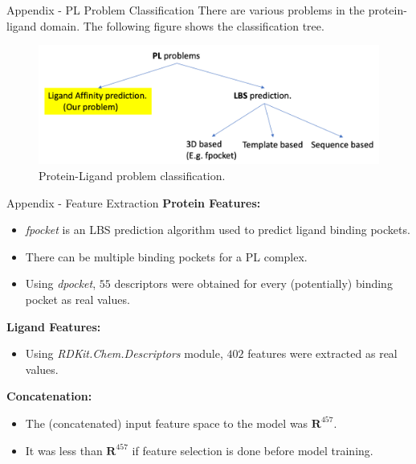 \documentclass{beamer}
\begin{document}
\begin{frame}[t]{Appendix - PL Problem Classification}
There are various problems in the protein-ligand domain.  The following figure shows the classification tree.

\begin{figure}[htb]
  \centering
    \includegraphics[scale=0.35]{images/pl_problem_classification}
    \caption{Protein-Ligand problem classification.}
    \label{fig:plproblemclassification}
\end{figure}

\end{frame}



\begin{frame}[t]{Appendix - Feature Extraction}
\textbf{Protein Features:}
\begin{itemize}
\item \textit{fpocket} is an LBS prediction algorithm used to predict ligand binding pockets.
\item There can be multiple binding pockets for a PL complex.
\item Using \textit{dpocket},  $55$ descriptors were obtained for every (potentially) binding pocket as real values.
\end{itemize}

\textbf{Ligand Features:}
\begin{itemize}
\item Using \textit{RDKit.Chem.Descriptors} module,  $402$ features were extracted as real values.
\end{itemize}

\textbf{Concatenation:}
\begin{itemize}
\item The (concatenated) input feature space to the model was $\mathbf{R}^{457}$.
\item It was less than $\mathbf{R}^{457}$ if feature selection is done before model training.
\end{itemize}

\end{frame}
\end{document}
